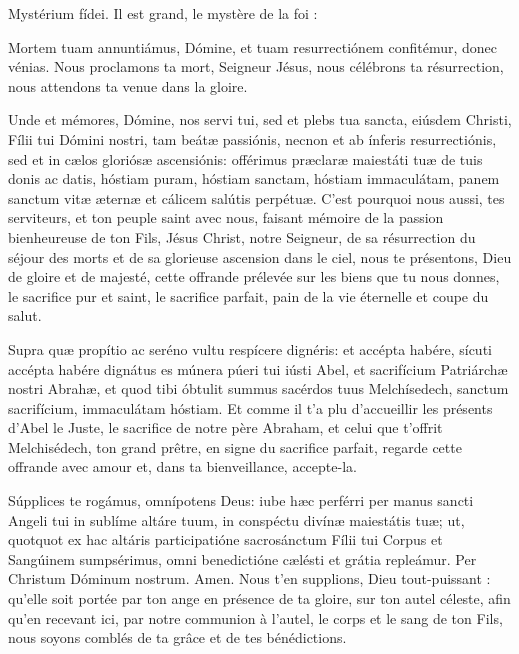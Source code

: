 \begin{paracol}{2}
\LigneParacol
{Mystérium fídei.}
{Il est grand, le mystère de la foi :}

\LigneParacol
{Mortem tuam annuntiámus, Dómine, et tuam resurrectiónem confitémur, donec vénias.}
{Nous proclamons ta mort, Seigneur Jésus, nous célébrons ta résurrection, nous attendons ta venue dans la gloire.}

\LigneParacol
{Unde et mémores, Dómine, nos servi tui, sed et plebs tua sancta, eiúsdem Christi, Fílii tui Dómini nostri, tam beátæ passiónis, necnon et ab ínferis resurrectiónis, sed et in cælos gloriósæ ascensiónis: offérimus præclaræ maiestáti tuæ de tuis donis ac datis, hóstiam puram, hóstiam sanctam, hóstiam immaculátam, panem sanctum vitæ æternæ et cálicem salútis perpétuæ.}
{C'est pourquoi nous aussi, tes serviteurs, et ton peuple saint avec nous, faisant mémoire de la passion bienheureuse de ton Fils, Jésus Christ, notre Seigneur, de sa résurrection du séjour des morts et de sa glorieuse ascension dans le ciel, nous te présentons, Dieu de gloire et de majesté, cette offrande prélevée sur les biens que tu nous donnes, le sacrifice pur et saint, le sacrifice parfait, pain de la vie éternelle et coupe du salut.}

\LigneParacol
{Supra quæ propítio ac seréno vultu respícere dignéris: et accépta habére, sícuti accépta habére dignátus es múnera púeri tui iústi Abel, et sacrifícium Patriárchæ nostri Abrahæ, et quod tibi óbtulit summus sacérdos tuus Melchísedech, sanctum sacrifícium, immaculátam hóstiam.}
{Et comme il t'a plu d'accueillir les présents d'Abel le Juste, le sacrifice de notre père Abraham, et celui que t'offrit Melchisédech, ton grand prêtre, en signe du sacrifice parfait, regarde cette offrande avec amour et, dans ta bienveillance, accepte-la.}

\LigneParacol
{Súpplices te rogámus, omnípotens Deus: iube hæc perférri per manus sancti Angeli tui in sublíme altáre tuum, in conspéctu divínæ maiestátis tuæ; ut, quotquot ex hac altáris participatióne sacrosánctum Fílii tui Corpus et Sangúinem sumpsérimus, omni benedictióne cælésti et grátia repleámur. Per Christum Dóminum nostrum. Amen.}
{Nous t'en supplions, Dieu tout-puissant : qu'elle soit portée par ton ange en présence de ta gloire, sur ton autel céleste, afin qu'en recevant ici, par notre communion à l'autel, le corps et le sang de ton Fils, nous soyons comblés de ta grâce et de tes bénédictions.}


\end{paracol}
